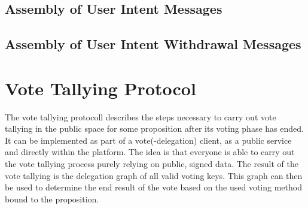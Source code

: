 \subsection{Assembly of User Intent Messages}


\subsection{Assembly of User Intent Withdrawal Messages}







\section{Vote Tallying Protocol}
\label{sec:VoteTallyingProtocol}
The vote tallying protocoll describes the steps necessary to carry out vote tallying in the public space for some proposition after its voting phase has ended.
It can be implemented as part of a vote(-delegation) client, as a public service and directly within the platform.
The idea is that everyone is able to carry out the vote tallying process purely relying on public, signed data.
The result of the vote tallying is the delegation graph of all valid voting keys.
This graph can then be used to determine the end result of the vote based on the used voting method bound to the proposition.




